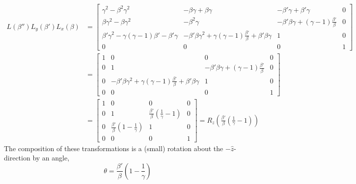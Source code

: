\documentclass[11pt]{amsart}
\begin{document}
\begin{align*}
L(\beta'') L_y(\beta')L_x(\beta) & = \begin{bmatrix}
\gamma^2 - \beta^2 \gamma^2  & - \beta \gamma + \beta 
\gamma & - \beta' \gamma + \beta' \gamma & 0 \\
\beta \gamma^2 - \beta \gamma^2  & - \beta^2 \gamma & - \beta' \beta \gamma + (\gamma - 1) \frac{\beta'}{\beta} & 0 \\
\beta' \gamma^2 - \gamma (\gamma - 1) \beta' - \beta' \gamma & - \beta' \beta \gamma^2 + \gamma (\gamma - 1) \frac{\beta'}{\beta} + \beta' \beta \gamma & 1 & 0 \\
0 & 0 & 0 & 1
\end{bmatrix} \\ 
& = 
\begin{bmatrix}
1  & 0 & 0 & 0 \\
0 & 1 & - \beta' \beta \gamma + (\gamma - 1) \frac{\beta'}{\beta} & 0 \\
0 & - \beta' \beta \gamma^2 + \gamma (\gamma - 1) \frac{\beta'}{\beta} + \beta' \beta \gamma & 1 & 0 \\
0 & 0 & 0 & 1
\end{bmatrix}  \\
&  = \begin{bmatrix}
1  & 0 & 0 & 0 \\
0 & 1 & \frac{\beta'}{\beta} (\frac{1}{\gamma} - 1) & 0 \\
0 & \frac{\beta'}{\beta} (1 - \frac{1}{\gamma}) & 1 & 0 \\
0 & 0 & 0 & 1
\end{bmatrix} = R_z\left(\frac{\beta'}{\beta} \left(\frac{1}{\gamma} - 1 \right)\right)
\end{align*}
The composition of these transformations is a (small) rotation about the $-\hat{z}$-direction by an angle, \[\theta = \frac{\beta'}{\beta} \left(1 - \frac{1}{\gamma} \right)\]
\end{document}
